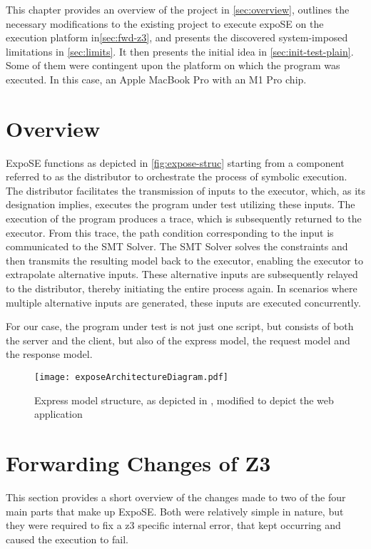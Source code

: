 
This chapter provides an overview of the project in \autoref{sec:overview}, outlines the necessary modifications to the existing project to execute expoSE on the execution platform in\autoref{sec:fwd-z3}, and presents the discovered system-imposed limitations in \autoref{sec:limits}. It then presents the initial idea in \autoref{sec:init-test-plain}. Some of them were contingent upon the platform on which the program was executed. In this case, an Apple MacBook Pro with an M1 Pro chip. 

\section{Overview}
\label{sec:overview}


ExpoSE functions as depicted in \autoref{fig:expose-struc} starting from a component referred to as the distributor to orchestrate the process of symbolic execution. The distributor facilitates the transmission of inputs to the executor, which, as its designation implies, executes the program under test utilizing these inputs. The execution of the program produces a trace, which is subsequently returned to the executor. From this trace, the path condition corresponding to the input is communicated to the SMT Solver. The SMT Solver solves the constraints and then transmits the resulting model back to the executor, enabling the executor to extrapolate alternative inputs. These alternative inputs are subsequently relayed to the distributor, thereby initiating the entire process again. In scenarios where multiple alternative inputs are generated, these inputs are executed concurrently.

For our case, the program under test is not just one script, but consists of both the server and the client, but also of the express model, the request model and the response model. 



\begin{figure}
  \centering
\texttt{[image: exposeArchitectureDiagram.pdf]}
 \caption{Express model structure, as depicted in \cite{loring_practical_2021}, modified to depict the web application}
     \label{fig:expose-struc}
\end{figure}


\FloatBarrier
\section{Forwarding Changes of Z3}
\label{sec:fwd-z3}
This section provides a short overview of the changes made to two of the four main parts that make up ExpoSE. Both were relatively simple in nature, but they were required to fix a z3 specific internal error, that kept occurring and caused the execution to fail.

